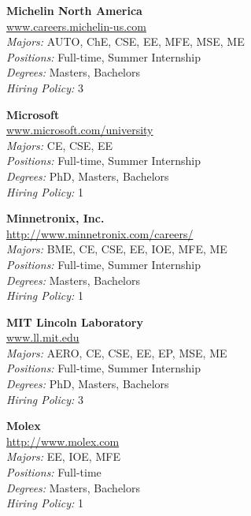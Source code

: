 \documentclass[twoside]{article}
\begin{document}
\begin{center}
\begin{multicols}{3}
\begin{minipage}{.9\columnwidth}{\Large\bf Michelin North America }\\
	\url{www.careers.michelin-us.com}\\
	\emph{Majors:} AUTO, ChE, CSE, EE, MFE, MSE, ME\\
	\emph{Positions:} Full-time, Summer Internship\\
	\emph{Degrees:} Masters, Bachelors\\
	\emph{Hiring Policy:} 3\\
\end{minipage}
 
\begin{minipage}{.9\columnwidth}{\Large\bf Microsoft }\\
	\url{www.microsoft.com/university}\\
	\emph{Majors:} CE, CSE, EE\\
	\emph{Positions:} Full-time, Summer Internship\\
	\emph{Degrees:} PhD, Masters, Bachelors\\
	\emph{Hiring Policy:} 1\\
\end{minipage}
 
\begin{minipage}{.9\columnwidth}{\Large\bf Minnetronix, Inc. }\\
	\url{http://www.minnetronix.com/careers/}\\
	\emph{Majors:} BME, CE, CSE, EE, IOE, MFE, ME\\
	\emph{Positions:} Full-time, Summer Internship\\
	\emph{Degrees:} Masters, Bachelors\\
	\emph{Hiring Policy:} 1\\
\end{minipage}
 
\begin{minipage}{.9\columnwidth}{\Large\bf MIT Lincoln Laboratory }\\
	\url{www.ll.mit.edu}\\
	\emph{Majors:} AERO, CE, CSE, EE, EP, MSE, ME\\
	\emph{Positions:} Full-time, Summer Internship\\
	\emph{Degrees:} PhD, Masters, Bachelors\\
	\emph{Hiring Policy:} 3\\
\end{minipage}
 
\begin{minipage}{.9\columnwidth}{\Large\bf Molex }\\
	\url{http://www.molex.com}\\
	\emph{Majors:} EE, IOE, MFE\\
	\emph{Positions:} Full-time\\
	\emph{Degrees:} Masters, Bachelors\\
	\emph{Hiring Policy:} 1\\
\end{minipage}
 

\end{multicols}
\end{center}
\end{document}
